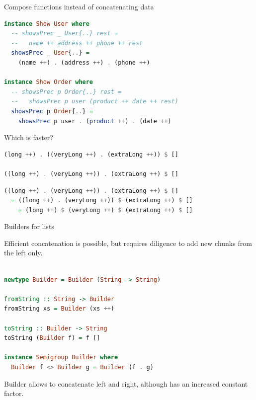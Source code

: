 \documentclass[handout]{beamer}
\begin{document}
\begin{frame}[fragile]{Compose functions instead of concatenating data}

\begin{lstlisting}[language=Haskell]
instance Show User where
  -- showsPrec _ User{..} rest =
  --   name ++ address ++ phone ++ rest
  showsPrec _ User{..} =
    (name ++) . (address ++) . (phone ++)

instance Show Order where
  -- showsPrec p Order{..} rest =
  --   showsPrec p user (product ++ date ++ rest)
  showsPrec p Order{..} =
    showsPrec p user . (product ++) . (date ++)
\end{lstlisting}

\end{frame}

\begin{frame}[fragile]{Which is faster?}

\begin{lstlisting}[language=Haskell]
(long ++) . ((veryLong ++) . (extraLong ++)) $ []

((long ++) . (veryLong ++)) . (extraLong ++) $ []
\end{lstlisting}

\begin{lstlisting}[language=Haskell]
((long ++) . (veryLong ++)) . (extraLong ++) $ []
  = ((long ++) . (veryLong ++)) $ (extraLong ++) $ []
    = (long ++) $ (veryLong ++) $ (extraLong ++) $ []
\end{lstlisting}

\end{frame}

\begin{frame}[fragile]{Builders for lists}

Efficient concatenation is possible, but requires diligence
        to add new chunks from the left only.

\begin{lstlisting}[language=Haskell]

newtype Builder = Builder (String -> String)

fromString :: String -> Builder
fromString xs = Builder (xs ++)

toString :: Builder -> String
toString (Builder f) = f []

instance Semigroup Builder where
  Builder f <> Builder g = Builder (f . g)
\end{lstlisting}

Builder allows to concatenate left and right,
        although has an increased constant factor.

\end{frame}
\end{document}

